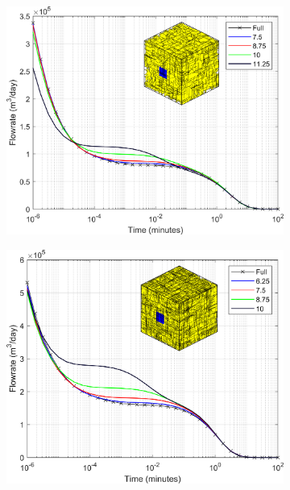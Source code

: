 \documentclass[main.tex]{subfiles}
\begin{document}
	\begin{figure}[ht]
		\centering
		\begin{subfigure}{0.3\textwidth}
			\includegraphics[width=\textwidth]{DD_main/Plot_Drawdown_Case_01_BCinset.png}
			\label{fig:DD_A}
		\end{subfigure}
		\begin{subfigure}{0.3\textwidth}
			\includegraphics[width=\textwidth]{DD_main/Plot_Drawdown_Case_03_BCinset.png}
			\label{fig:DD_B}

\end{subfigure}
\end{figure}
\end{document}
